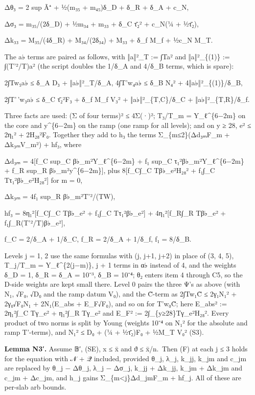 \documentclass[
]{article}
\begin{document}
Δθ₃ = 2 sup Ã⁺ + ½(m₃₅ + m₄₅)δ\_D + δ\_R + δ\_A + c\_N,

Δσ₃ = m₃₅/(2δ\_D) + ½m₃₄ + m₃₃ + δ\_C τ̄₂² + c\_N(¼ + ½τ̄₂),

Δk₃₃ = M₃₅/(4δ\_R) + M₃₄/(2δ₃₄) + M₃₃ + δ\_f M\_f + ½c\_N M\_T.

The a♭ terms are paired as follows, with ‖a‖²\_T := ∫Ta² and
‖a‖²\_\{(1)\} := ∫(T'²/T)a² (the script doubles the 1/δ\_A and 4/δ\_B
terms, which is spare):

2∫Tw₅a♭ ≤ δ\_A D₃ + ‖a♭‖²\_T/δ\_A, 4∫T'w₄a♭ ≤ δ\_B N₄² +
4‖a♭‖²\_\{(1)\}/δ\_B,

2∫T'\,'w₃a♭ ≤ δ\_C τ̄₂²F₃ + δ\_f M\_f V₃² + ‖a♭‖²\_\{T,C\}/δ\_C +
‖a♭‖²\_\{T,R\}/δ\_f.

Three facts are used: (Σ of four terms)² ≤ 4Σ(·)²; T₃/T\_m =
Y\_ℓ\^{}\{6−2m\} on the core and y\^{}\{6−2m\} on the ramp (one ramp for
all levels); and on y ≥ 28, e² ≤ 2η₁² + 2H₂₈²F₀. Together they add to h₃
the terms Σ\_\{m≤2\}(Δd₃ₘF\_m + Δk₃ₘV\_m²) + hf₃, where

Δd₃ₘ = 4{[}f\_C sup\_C β♭\_m²Y\_ℓ\^{}\{6−2m\} + f₁ sup\_C
τ₁²β♭\_m²Y\_ℓ\^{}\{6−2m\} + f\_R sup\_R β♭\_m²y\^{}\{6−2m\}{]}, plus
8{[}f\_C∫\_C Tβ♭\_e²H₂₈² + f₁∫\_C Tτ₁²β♭\_e²H₂₈²{]} for m = 0,

Δk₃ₘ = 4f₁ sup\_R β♭\_m²T'²/(TW),

hf₃ = 8η₁²{[}f\_C∫\_C Tβ♭\_e² + f₁∫\_C Tτ₁²β♭\_e²{]} + 4η₁²{[}f\_R∫\_R
Tβ♭\_e² + f₁∫\_R(T'²/T)β♭\_e²{]},

f\_C = 2/δ\_A + 1/δ\_C, f\_R = 2/δ\_A + 1/δ\_f, f₁ = 8/δ\_B.

Levels j = 1, 2 use the same formulas with (j, j+1, j+2) in place of (3,
4, 5), T\_j/T\_m = Y\_ℓ\^{}\{2(j−m)\}, j + 1 terms in α♭ instead of 4,
and the weights δ\_D = 1, δ\_R = δ\_A = 10⁻³, δ\_B = 10⁻⁴; θ₂ enters
item 4 through C5, so the D-side weights are kept small there. Level 0
pairs the three Ψ's as above (with N₁, √F₀, √D₀ and the ramp datum V₀),
and the C̃-term as 2∫T\textbar w₁\textbar\textbar C̃\textbar{} ≤ 2γ₁N₁² +
2γ₀√F₀N₁ + 2N₁(E\_abs + E\_F√F₀), and so on for T'w₀C̃; here E\_abs² :=
2η₁²∫\_C Tγ\_e² + η₁²∫\_R Tγ\_e² and E\_F² := 2∫\_\{y≥28\}Tγ\_e²H₂₈².
Every product of two norms is split by Young (weights 10⁻⁴ on N₁² for
the absolute and ramp T'-terms), and N₁² ≤ D₀ + (¼ + ½τ̄₂)F₀ + ½M\_T V₀²
(S3).

\textbf{Lemma N3′.} Assume 𝔹′, (SE), \textbar x\textbar{} ≤ x̄ and
\textbar ϑ\textbar{} ≤ x̄/n.~Then (F) at each j ≤ 3 holds for the
equation with 𝒩 + 𝒬 included, provided θ\_j, λ\_j, k\_jj, k\_jm and
c\_jm are replaced by θ\_j − Δθ\_j, λ\_j − Δσ\_j, k\_jj + Δk\_jj, k\_jm
+ Δk\_jm and c\_jm + Δc\_jm, and h\_j gains
Σ\_\{m\textless j\}Δd\_jmF\_m + hf\_j. All of these are per-slab arb
bounds.
\end{document}
